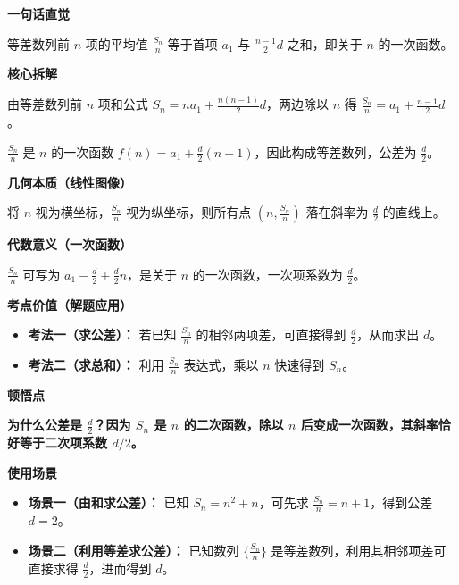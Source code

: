 \begin{explanationbox}
	\textbf{\textcolor{CExplanation}{一句话直觉}}

	等差数列前 $n$ 项的平均值 $\frac{S_n}{n}$ 等于首项 $a_1$ 与 $\frac{n-1}{2}d$ 之和，即关于 $n$ 的一次函数。

	\medskip
	\textbf{\textcolor{CExplanation}{核心拆解}}
	\begin{description}[style=nextline, leftmargin=2.8em, labelsep=0.5em, itemsep=0.45em]
		\item[\textbf{要点一（公式变形）：}] 由等差数列前 $n$ 项和公式 $S_n = n a_1 + \frac{n(n-1)}{2}d$，两边除以 $n$ 得 $\frac{S_n}{n} = a_1 + \frac{n-1}{2}d$。
		\item[\textbf{要点二（线性关系）：}] $\frac{S_n}{n}$ 是 $n$ 的一次函数 $f(n) = a_1 + \frac{d}{2}(n-1)$，因此构成等差数列，公差为 $\frac{d}{2}$。
	\end{description}

	\medskip
	\textbf{\textcolor{CExplanation}{几何本质（线性图像）}}

	将 $n$ 视为横坐标，$\frac{S_n}{n}$ 视为纵坐标，则所有点 $(n, \frac{S_n}{n})$ 落在斜率为 $\frac{d}{2}$ 的直线上。

	\medskip
	\textbf{\textcolor{CExplanation}{代数意义（一次函数）}}

	$\frac{S_n}{n}$ 可写为 $a_1 - \frac{d}{2} + \frac{d}{2}n$，是关于 $n$ 的一次函数，一次项系数为 $\frac{d}{2}$。

	\medskip
	\textbf{\textcolor{CExplanation}{考点价值（解题应用）}}
	\begin{itemize}[leftmargin=*, itemsep=0.5em, topsep=0.4em]
		\item \textbf{考法一（求公差）：} 若已知 $\frac{S_n}{n}$ 的相邻两项差，可直接得到 $\frac{d}{2}$，从而求出 $d$。
		\item \textbf{考法二（求总和）：} 利用 $\frac{S_n}{n}$ 表达式，乘以 $n$ 快速得到 $S_n$。
	\end{itemize}

	\medskip
	\textbf{\textcolor{CExplanation}{顿悟点}}

	\textbf{为什么公差是 $\frac{d}{2}$？因为 $S_n$ 是 $n$ 的二次函数，除以 $n$ 后变成一次函数，其斜率恰好等于二次项系数 $d/2$。}

	\medskip
	\textbf{\textcolor{CExplanation}{使用场景}}
	\begin{itemize}[leftmargin=*, itemsep=0.5em, topsep=0.4em]
		\item \textbf{场景一（由和求公差）：} 已知 $S_n = n^2 + n$，可先求 $\frac{S_n}{n} = n+1$，得到公差 $d=2$。
		\item \textbf{场景二（利用等差求公差）：} 已知数列 $\{\frac{S_n}{n}\}$ 是等差数列，利用其相邻项差可直接求得 $\frac{d}{2}$，进而得到 $d$。
	\end{itemize}
\end{explanationbox}
